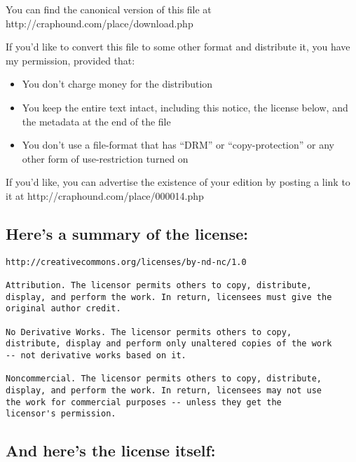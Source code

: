 You can find the canonical version of this file at\\
http://craphound.com/place/download.php

If you'd like to convert this file to some other format and
distribute it, you have my permission, provided that:

\begin{itemize}
\item
  You don't charge money for the distribution

\item
  You keep the entire text intact, including this notice, the license
  below, and the metadata at the end of the file

\item
  You don't use a file-format that has ``DRM'' or ``copy-protection''
  or any other form of use-restriction turned on

\end{itemize}
If you'd like, you can advertise the existence of your edition by
posting a link to it at http://craphound.com/place/000014.php


\subsection{Here's a summary of the license:}

\begin{verbatim}
http://creativecommons.org/licenses/by-nd-nc/1.0

Attribution. The licensor permits others to copy, distribute,
display, and perform the work. In return, licensees must give the
original author credit.

No Derivative Works. The licensor permits others to copy,
distribute, display and perform only unaltered copies of the work
-- not derivative works based on it.

Noncommercial. The licensor permits others to copy, distribute,
display, and perform the work. In return, licensees may not use
the work for commercial purposes -- unless they get the
licensor's permission.
\end{verbatim}

\subsection{And here's the license itself:}

